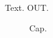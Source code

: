 \documentclass{article}
\def\inner{OUT}
\begin{document}
Text.\label{a} \inner.
\begin{figure}
\caption{Cap.\label{fig:a}}
\end{figure}
\end{document}
